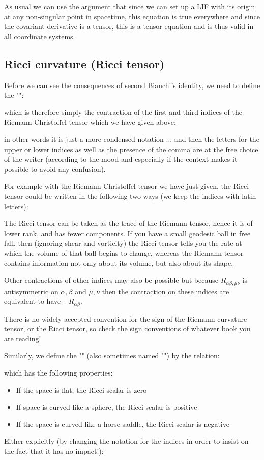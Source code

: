 	As usual we can use the argument that since we can set up a LIF with its origin at any non-singular point in spacetime, this equation is true everywhere and since the covariant derivative is a tensor, this is a tensor equation and is thus valid in all coordinate systems.
	
	
	\subsection{Ricci curvature (Ricci tensor)}
	Before we can see the consequences of second Bianchi's identity, we need to define the "":
	
	which is therefore simply the contraction of the first and third indices of the Riemann-Christoffel tensor which we have given above:
	
	in other words it is just a more condensed notation ... and then the letters for the upper or lower indices as well as the presence of the comma are at the free choice of the writer (according to the mood and especially if the context makes it possible to avoid any confusion).

	For example with the Riemann-Christoffel tensor we have just given, the Ricci tensor could be written in the following two ways (we keep the indices with latin letters):
	
	The Ricci tensor can be taken as the trace of the Riemann tensor, hence it is of lower rank, and has fewer components. If you have a small geodesic ball in free fall, then (ignoring shear and vorticity) the Ricci tensor tells you the rate at which the volume of that ball begins to change, whereas the Riemann tensor contains information not only about its volume, but also about its shape. 
	
	Other contractions of other indices may also be possible but because $R_{\alpha\beta,\mu\nu}$ is antisymmetric on $\alpha,\beta$ and $\mu,\nu$ then the contraction on these indices are equivalent to have $\pm R_{\alpha\beta}$.
	\begin{tcolorbox}[title=Remark,colframe=black,arc=10pt]
	There is no widely accepted convention for the sign of the Riemann
curvature tensor, or the Ricci tensor, so check the sign conventions of whatever book you are reading!
	\end{tcolorbox}
	Similarly, we define the "" (also sometimes named "") by the relation:
	
	which has the following properties:
	\begin{itemize}
		\item If the space is flat, the Ricci scalar is zero
	
		\item If space is curved like a sphere, the Ricci scalar is positive
	
		\item If the space is curved like a horse saddle, the Ricci scalar is negative
	\end{itemize}
	Either explicitly (by changing the notation for the indices in order to insist on the fact that it has no impact!):
	
